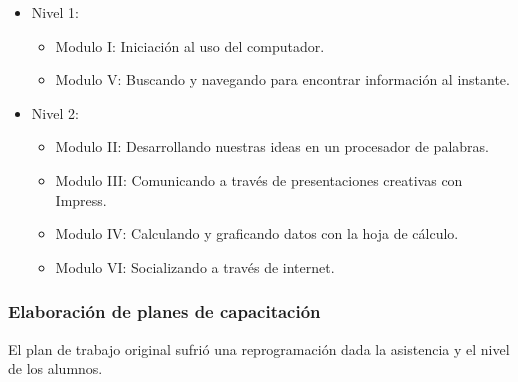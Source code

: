                 \begin{itemize}
                    \item Nivel 1:
                    \begin{itemize}
                        \item Modulo I: Iniciación al uso del computador.
                        \item Modulo V: Buscando y navegando para encontrar información al instante.
                    \end{itemize}
                    \item Nivel 2:
                    \begin{itemize}
                        \item Modulo II: Desarrollando nuestras ideas en un procesador de palabras.
                        \item Modulo III: Comunicando a través de presentaciones creativas con Impress.
                        \item Modulo IV: Calculando y graficando datos con la hoja de cálculo.
                        \item Modulo VI: Socializando a través de internet.
                    \end{itemize}
                \end{itemize}
                
            \subsubsection {Elaboración de planes de capacitación}
            
            El plan de trabajo original sufrió una reprogramación dada la asistencia y el nivel de los alumnos.
            
